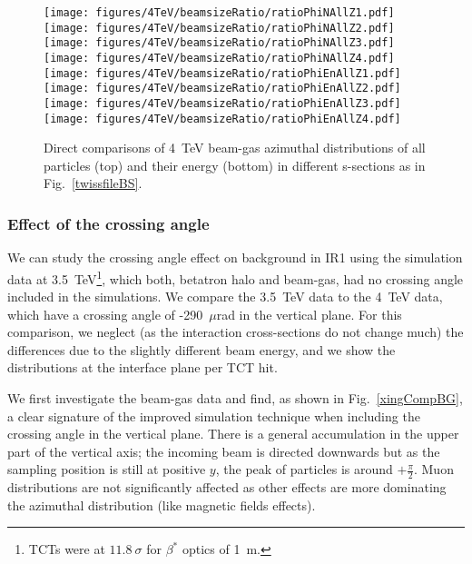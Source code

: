 \begin{figure}%
\begin{center}
  \texttt{[image: figures/4TeV/beamsizeRatio/ratioPhiNAllZ1.pdf]}
  \texttt{[image: figures/4TeV/beamsizeRatio/ratioPhiNAllZ2.pdf]}
  \texttt{[image: figures/4TeV/beamsizeRatio/ratioPhiNAllZ3.pdf]}
  \texttt{[image: figures/4TeV/beamsizeRatio/ratioPhiNAllZ4.pdf]}
  \texttt{[image: figures/4TeV/beamsizeRatio/ratioPhiEnAllZ1.pdf]}
  \texttt{[image: figures/4TeV/beamsizeRatio/ratioPhiEnAllZ2.pdf]}
  \texttt{[image: figures/4TeV/beamsizeRatio/ratioPhiEnAllZ3.pdf]}
  \texttt{[image: figures/4TeV/beamsizeRatio/ratioPhiEnAllZ4.pdf]}
\end{center}
\vspace{-0.6cm}
 \caption{Direct comparisons of 4~TeV beam-gas azimuthal distributions of all particles (top) and their energy (bottom) in different s-sections as in Fig.~\ref{twissfileBS}.
  \label{bsZAll}}
\end{figure}

 
\subsubsection{Effect of the crossing angle}

We can study the crossing angle effect on background in IR1 using the simulation data at 3.5~TeV\footnote{TCTs were at $11.8~\sigma$ for $\beta^*$ optics of 1~m.}, which both, betatron halo and beam-gas, had no crossing angle included in the simulations. We compare the 3.5~TeV data to the 4~TeV data, which have a crossing angle of -290~$\mu$rad in the vertical plane. For this comparison, we neglect (as the interaction cross-sections do not change much) the differences due to the slightly different beam energy, and we show the distributions at the interface plane per TCT hit. 

We first investigate the beam-gas data and find, as shown in Fig.~\ref{xingCompBG}, a clear signature of the improved simulation technique when including the crossing angle in the vertical plane. There is a general accumulation in the upper part of the vertical axis; the incoming beam is directed downwards but as the sampling position is still at positive $y$, the peak of particles is around $+ \frac{\pi}{2}$. Muon distributions are not significantly affected as other effects are more dominating the azimuthal distribution (like magnetic fields effects). 


